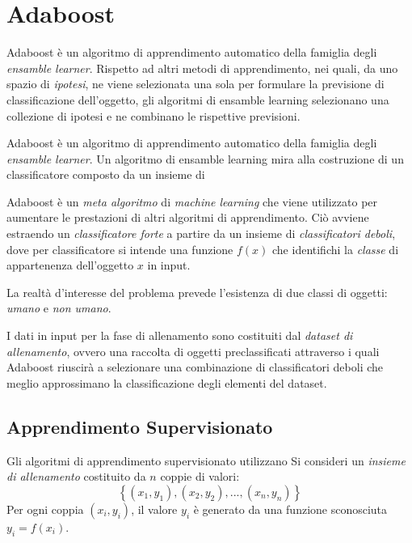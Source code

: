 
\chapter{Adaboost}
\label{cap:adaboost}

Adaboost è un algoritmo di apprendimento automatico della famiglia degli \emph{ensamble learner}.
Rispetto ad altri metodi di apprendimento, nei quali, da uno spazio di \emph{ipotesi}, ne viene selezionata una sola per formulare la previsione di classificazione dell'oggetto, gli algoritmi di ensamble learning selezionano una collezione di ipotesi e ne combinano le rispettive previsioni.

Adaboost è un algoritmo di apprendimento automatico della famiglia degli \emph{ensamble learner}. Un algoritmo di ensamble learning mira alla costruzione di un classificatore composto da un insieme di


Adaboost è un \emph{meta algoritmo} di \emph{machine learning} che viene utilizzato per aumentare le prestazioni di altri algoritmi di apprendimento. Ciò avviene estraendo un \emph{classificatore forte} a partire da un insieme di \emph{classificatori deboli}, dove per classificatore si intende una funzione $f(x)$ che identifichi la \emph{classe} di appartenenza dell'oggetto $x$ in input.

La realtà d'interesse del problema prevede l'esistenza di due classi di oggetti: \emph{umano} e \emph{non umano}.

I dati in input per la fase di allenamento sono costituiti dal \emph{dataset di allenamento}, ovvero una raccolta di oggetti preclassificati attraverso i quali Adaboost riuscirà a selezionare una combinazione di classificatori deboli che meglio approssimano la classificazione degli elementi del dataset.

\section{Apprendimento Supervisionato}
\label{sec:supervised_learning}
Gli algoritmi di apprendimento supervisionato utilizzano
Si consideri un \emph{insieme di allenamento} costituito da $n$ coppie di valori:
$$ \left\{ (x_1, y_1), (x_2, y_2), ..., (x_n, y_n) \right\} $$
Per ogni coppia $(x_i, y_i)$, il valore $y_i$ è generato da una funzione sconosciuta $y_i = f(x_i)$.

